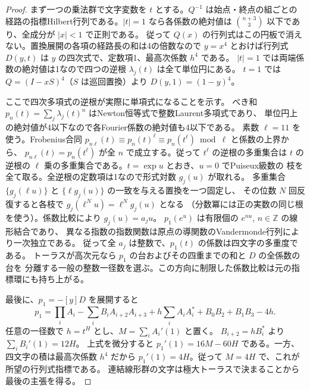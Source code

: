 \begin{proof}
まず一つの乗法群で文字変数を $t$ とする。$Q^{-1}$ は始点・終点の組ごとの
経路の指標Hilbert行列である。$|t|=1$ なら各係数の絶対値は
$\binom{n+3}{3}$ 以下であり、全成分が $|x|<1$ で正則である。
従って $Q(x)$ の行列式はこの円板で消えない。置換展開の各項の経路長の和は4の倍数なので
$y=x^4$ とおけば行列式 $D(y,t)$ は $y$ の四次式で、定数項1、最高次係数 $h^4$ である。
$|t|=1$ では両端係数の絶対値は1なので四つの逆根 $\lambda_j(t)$ は全て単位円にある。
$t=1$ では $Q=(I-xS)^4$（$S$ は巡回置換）より $D(y,1)=(1-y)^4$。

ここで四次多項式の逆根が実際に単項式になることを示す。
べき和 $p_n(t)=\sum_j\lambda_j(t)^n$ はNewton恒等式で整数Laurent多項式であり、
単位円上の絶対値が4以下なので各Fourier係数の絶対値も4以下である。
素数 $\ell=11$ を使う。Frobenius合同
$p_{n\ell}(t)\equiv p_n(t)^\ell\equiv p_n(t^\ell)\bmod\ell$ と係数の上界から、
$p_{n\ell}(t)=p_n(t^\ell)$ が全 $n$ で成立する。従って $t^\ell$ の逆根の多重集合は
$t$ の逆根の $\ell$ 乗の多重集合である。$t=\exp u$ とおき、$u=0$ でPuiseux級数の
枝を全て取る。全逆根の定数項は1なので形式対数 $g_j(u)$ が取れる。
多重集合 $\{g_j(\ell u)\}$ と $\{\ell g_j(u)\}$ の一致を与える置換を一つ固定し、
その位数 $N$ 回反復すると各枝で $g_j(\ell^N u)=\ell^N g_j(u)$ となる
（分数冪には正の実数の同じ根を使う）。係数比較により $g_j(u)=a_j u$。
$p_1(e^u)$ は有限個の $e^{nu}$, $n\in\mathbb Z$ の線形結合であり、
異なる指数の指数関数は原点の導関数のVandermonde行列により一次独立である。
従って全 $a_j$ は整数で、$p_1(t)$ の係数は四文字の多重度である。
トーラスが高次元なら $p_1$ の台およびその四重までの和と $D$ の全係数の台を
分離する一般の整数一径数を選ぶ。この方向に制限した係数比較は元の指標環にも持ち上がる。

最後に、$p_1=-[y]D$ を展開すると
\[
 p_1=\prod_i A_i-\sum_i B_i A_{i+2}A_{i+3}
       +h\sum_i A_i A_i^*+B_0B_2+B_1B_3-4h .
\]
任意の一径数で $h=t^H$ とし、$M=\sum_i A_i'(1)$ と置く。
$B_{i+2}=hB_i^*$ より $\sum_i B_i'(1)=12H$。
上式を微分すると $p_1'(1)=16M-60H$ である。一方、四文字の積は最高次係数
$h^4$ だから $p_1'(1)=4H$。従って $M=4H$ で、これが所望の行列式指標である。
連結線形群の文字は極大トーラスで決まることから最後の主張を得る。
\end{proof}

